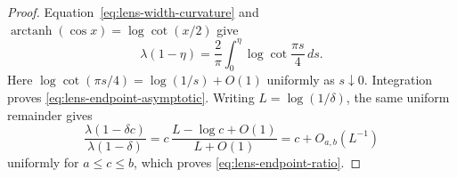 \begin{proof}
Equation~\eqref{eq:lens-width-curvature} and
$\operatorname{arctanh}(\cos x)=\log\cot(x/2)$ give
\[
 \lambda(1-\eta)=\frac2\pi\int_0^\eta
                  \log\cot\frac{\pi s}{4}\,ds.
\]
Here $\log\cot(\pi s/4)=\log(1/s)+O(1)$ uniformly as $s\downarrow0$.
Integration proves \eqref{eq:lens-endpoint-asymptotic}.
Writing $L=\log(1/\delta)$, the same uniform remainder gives
\[
 \frac{\lambda(1-\delta c)}{\lambda(1-\delta)}
 =c\,\frac{L-\log c+O(1)}{L+O(1)}
 =c+O_{a,b}(L^{-1})
\]
uniformly for $a\leq c\leq b$, which proves
\eqref{eq:lens-endpoint-ratio}.
\end{proof}
